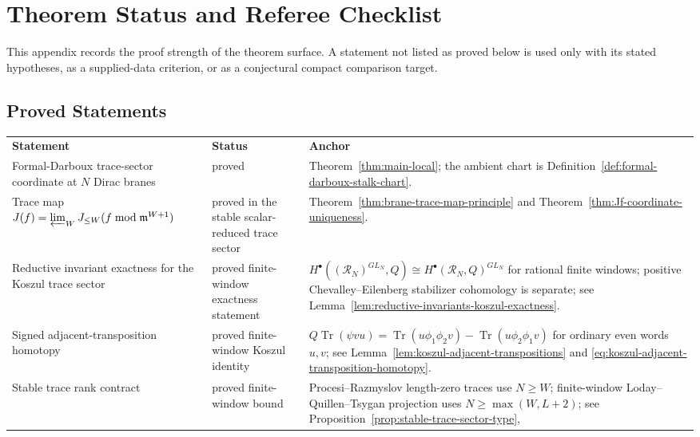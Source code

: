 \section{Theorem Status and Referee Checklist}
\label{app:final-theorem-status}

This appendix records the proof strength of the theorem surface.  A
statement not listed as proved below is used only with its stated
hypotheses, as a supplied-data criterion, or as a conjectural compact
comparison target.

\subsection{Proved Statements}

\begin{center}
\footnotesize
\renewcommand{\arraystretch}{1.15}
\begin{tabular}{@{}>{\raggedright\arraybackslash}p{}
  >{\raggedright\arraybackslash}p{}
  >{\raggedright\arraybackslash}p{}@{}}
\textbf{Statement} & \textbf{Status} & \textbf{Anchor} \\
Formal-Darboux trace-sector coordinate at \(N\) Dirac branes &
proved &
Theorem~\ref{thm:main-local}; the ambient chart is
Definition~\ref{def:formal-darboux-stalk-chart}. \\
Trace map \(J(f)=\varprojlim_WJ_{\leq W}(f\bmod\mathfrak m^{W+1})\) &
proved in the stable scalar-reduced trace sector &
Theorem~\ref{thm:brane-trace-map-principle} and
Theorem~\ref{thm:Jf-coordinate-uniqueness}. \\
Reductive invariant exactness for the Koszul trace sector &
proved finite-window exactness statement &
\(H^\bullet((\mathcal R_N)^{GL_N},Q)
\cong H^\bullet(\mathcal R_N,Q)^{GL_N}\) for rational finite windows;
positive Chevalley--Eilenberg stabilizer cohomology is separate;
see Lemma~\ref{lem:reductive-invariants-koszul-exactness}. \\
Signed adjacent-transposition homotopy &
proved finite-window Koszul identity &
\(Q\operatorname{Tr}(\psi vu)=
\operatorname{Tr}(u\phi_1\phi_2v)-
\operatorname{Tr}(u\phi_2\phi_1v)\) for ordinary even words \(u,v\);
see Lemma~\ref{lem:koszul-adjacent-transpositions} and
\eqref{eq:koszul-adjacent-transposition-homotopy}. \\
Stable trace rank contract &
proved finite-window bound &
Procesi--Razmyslov length-zero traces use \(N\ge W\);
finite-window Loday--Quillen--Tsygan projection uses
\(N\ge\max(W,L+2)\);
see Proposition~\ref{prop:stable-trace-sector-type},

\end{tabular}
\end{center}
